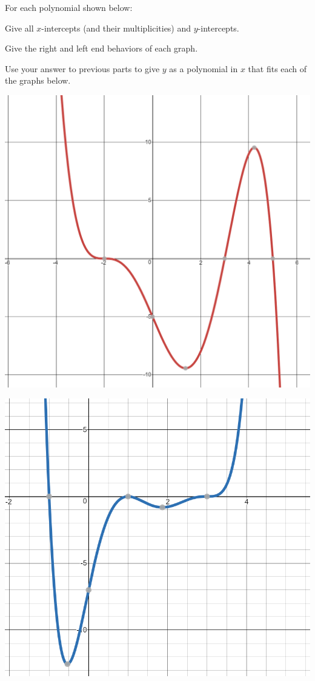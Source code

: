 \bq For each polynomial shown below:
\be
\item Give all $x$-intercepts (and their multiplicities) and $y$-intercepts.
\item Give the right and left end behaviors of each graph.
\item Use your answer to previous parts to give $y$ as a polynomial in $x$ that fits each of the graphs below.
\ee
\begin{center} \includegraphics[scale=.35]{p3.png} \end{center}

\begin{center} \includegraphics[scale=.45]{p4.png} \end{center}
\eq

